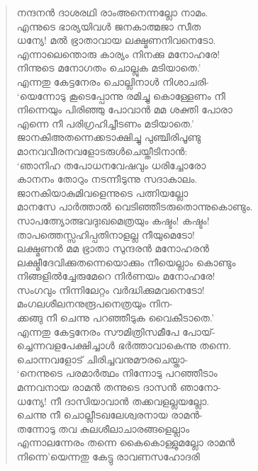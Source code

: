 \begin{verse}
നന്ദനന്‍ ദാശരഥി രാംഅനെന്നല്ലോ നാമം.\\
എന്നുടെ ഭാര്യയിവള്‍ ജനകാത്മജാ സീത\\
ധന്യേ! മല്‍ ഭ്രാതാവായ ലക്ഷ്മണനിവനെടോ.\\
എന്നാലെന്തൊരു കാര്യം നിനക്കു മനോഹരേ!\\
നിന്നുടെ മനോഗതം ചൊല്ലുക മടിയാതെ.’\\
എന്നതു കേട്ടനേരം ചൊല്ലിനാള്‍ നിശാചരി-\\
‘യെന്നോടു കൂടെപ്പോന്നു രമിച്ചു കൊള്ളേണം നീ\\
നിന്നെയും പിരിഞ്ഞു പോവാന്‍ മമ ശക്തി പോരാ\\
എന്നെ നീ പരിഗ്രഹിച്ചീടണം മടിയാതെ.’\\
ജാനകിഅതന്നെക്കടാക്ഷിച്ചു പുഞ്ചിരിപൂണ്ടു\\
മാനവവീരനവളോടരുള്‍ചെയ്തീടിനാന്‍:\\
‘ഞാനിഹ തപോധനവേഷവും ധരിച്ചോരോ\\
കാനനം തോറും നടന്നീടുന്നു സദാകാലം.\\
ജാനകിയാകുമിവളെന്നുടെ പത്നിയല്ലോ\\
മാനസേ പാര്‍ത്താല്‍ വെടിഞ്ഞീടരുതൊന്നുകൊണ്ടും.\\
സാപത്ന്യോത്ഭവദുഃഖമെത്രയും കഷ്ടം! കഷ്ടം!\\
താപത്തെസ്സഹിപ്പതിനാളല്ല നീയുമെടോ!\\
ലക്ഷ്മണന്‍ മമ ഭ്രാതാ സുന്ദരന്‍ മനോഹരന്‍\\
ലക്ഷ്മീദേവിക്കുതന്നെയൊക്കും നീയെല്ലാം കൊണ്ടും\\
നിങ്ങളില്‍ച്ചേരുമേറെ നിര്‍ണയം മനോഹരേ!\\
സംഗവും നിന്നിലേറ്റം വര്‍ദ്ധിക്കുമവനെടോ!\\
മംഗലശീലനനുരൂപനെത്രയും നിന-\\
ക്കങ്ങു നീ ചെന്നു പറഞ്ഞീടുക വൈകീടാതെ.’\\
എന്നതു കേട്ടനേരം സൗമിത്രിസമീപേ പോയ്-\\
ച്ചെന്നവളപേക്ഷിച്ചാള്‍ ഭര്‍ത്താവാകെന്നു തന്നെ.\\
ചൊന്നവളോട് ചിരിച്ചവനുമൗരചെയ്താ-\\
‘നെന്നുടെ പരമാര്‍ത്ഥം നിന്നോടു പറഞ്ഞീടാം\\
മന്നവനായ രാമന്‍ തന്നുടെ ദാസന്‍ ഞാനോ-\\
ധന്യേ! നീ ദാസിയാവാന്‍ തക്കവളല്ലയല്ലോ.\\
ചെന്നു നീ ചൊല്ലീടഖലേശ്വരനായ രാമന്‍-\\
തന്നോടു തവ കുലശീലാചാരങ്ങളെല്ലാം\\
എന്നാലന്നേരം തന്നെ കൈകൊള്ളുമല്ലോ രാമന്‍\\
നിന്നെ’യെന്നതു കേട്ടു രാവണസഹോദരി\\

\end{verse}
